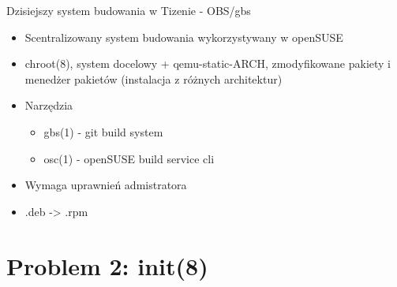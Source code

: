 \documentclass[presentation,aspectratio=43,12pt]{beamer}
\begin{document}
\begin{frame}[label=sec-5-11]{Dzisiejszy system budowania w Tizenie - OBS/gbs}
\begin{itemize}
\item Scentralizowany system budowania wykorzystywany w openSUSE
\item chroot(8), system docelowy + qemu-static-ARCH, zmodyfikowane
pakiety i menedżer pakietów (instalacja z różnych architektur)
\end{itemize}


\begin{itemize}
\item Narzędzia
\begin{itemize}
\item gbs(1) - git build system
\item osc(1) - openSUSE build service cli
\end{itemize}
\end{itemize}

\pause

\begin{itemize}
\item Wymaga uprawnień admistratora
\item .deb -> .rpm
\end{itemize}

\end{frame}

\section{Problem 2: init(8)}
\label{sec-6}
\end{document}
